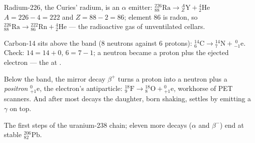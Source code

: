 \begin{example}\label{ex:g11:nucleus-radioactivity:alpha}
Radium-226, the Curies' radium, is an $\alpha$ emitter:
${}^{226}_{88}\mathrm{Ra} \to {}^{A}_{Z}\mathrm{Y} + {}^{4}_{2}\mathrm{He}$
 $A = 226 - 4 = 222$ and $Z = 88 - 2 = 86$; element $86$ is radon, so
${}^{226}_{88}\mathrm{Ra} \to {}^{222}_{86}\mathrm{Rn} + {}^{4}_{2}\mathrm{He}$
--- the radioactive gas of unventilated cellars.
\end{example}

\begin{example}\label{ex:g11:nucleus-radioactivity:beta}
Carbon-14 sits above the band ($8$ neutrons against $6$ protons):
${}^{14}_{6}\mathrm{C} \to {}^{14}_{7}\mathrm{N} + {}^{\;0}_{-1}\mathrm{e}$.
Check: $14 = 14 + 0$, $6 = 7 - 1$; a neutron became a proton plus the
ejected electron --- the  at .
\end{example}

\begin{remark}\label{rem:g11:nucleus-radioactivity:betaplus}
Below the band, the mirror decay $\beta^+$ turns a proton into a neutron
plus a \emph{positron} ${}^{0}_{+1}\mathrm{e}$, the electron's antiparticle:
${}^{18}_{9}\mathrm{F} \to {}^{18}_{8}\mathrm{O} + {}^{0}_{+1}\mathrm{e}$,
workhorse of PET scanners. And after most decays the daughter, born shaking,
settles by emitting a $\gamma$ on top.
\end{remark}

\begin{omfigure}

{\small The first steps of the uranium-238 chain; eleven more decays
($\alpha$ and $\beta^-$) end at stable ${}^{206}_{82}\mathrm{Pb}$.}
\end{omfigure}

